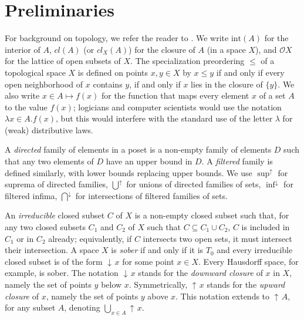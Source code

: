 \documentclass[preprint,12pt]{elsarticle}
\DeclareMathOperator{\upc}{\uparrow\!}
\DeclareMathOperator{\dc}{\downarrow\!}
\newcommand\Smyth{{\mathcal Q}}
\newcommand\Vt{\mathsf{V}}
\newcommand\SV{\Smyth_{\Vt}}
\newcommand\Val{{\mathbf V}}
\newcommand\Open{{\mathcal O}}
\newcommand\Topcat{\mathbf{Top}}
\newcommand{\interior}[1]{\text{int} ({#1})} %
\newcommand\dsup{\sup\nolimits^{\scriptstyle\uparrow}}
\newcommand\finf{\inf\nolimits^{\scriptstyle\downarrow}}
\newcommand\dcup{\bigcup\nolimits^{\scriptstyle\uparrow}}
\newcommand\fcap{\bigcap\nolimits^{\scriptstyle\downarrow}}
\begin{document}

\section{Preliminaries}
\label{sec:preliminaries}


For background on topology, we refer the reader to
\cite{JGL-topology}.  We write $\interior A$ for the interior of $A$,
$cl (A)$ (or $cl_X (A)$) for the closure of $A$ (in a space $X$), and
$\Open X$ for the lattice of open subsets of $X$.  The specialization
preordering $\leq$ of a topological space $X$ is defined on points
$x, y \in X$ by $x \leq y$ if and only if every open neighborhood of
$x$ contains $y$, if and only if $x$ lies in the closure of $\{y\}$.
We also write $x \in A \mapsto f (x)$ for the function that maps every
element $x$ of a set $A$ to the value $f (x)$; logicians and computer
scientists would use the notation $\lambda x \in A . f (x)$, but this
would interfere with the standard use of the letter $\lambda$ for
(weak) distributive laws.

A \emph{directed} family of elements in a poset is a non-empty family
of elements $D$ such that any two elements of $D$ have an upper bound
in $D$.  A \emph{filtered} family is defined similarly, with lower
bounds replacing upper bounds.  We use $\dsup$ for suprema of directed
families, $\dcup$ for unions of directed families of sets, $\finf$ for
filtered infima, $\fcap$ for intersections of filtered families of
sets.

An \emph{irreducible} closed subset $C$ of $X$ is a non-empty closed
subset such that, for any two closed subsets $C_1$ and $C_2$ of $X$
such that $C \subseteq C_1 \cup C_2$, $C$ is included in $C_1$ or in
$C_2$ already; equivalently, if $C$ intersects two open sets, it must
intersect their intersection.  A space $X$ is \emph{sober} if and only
if it is $T_0$ and every irreducible closed subset is of the form
$\dc x$ for some point $x \in X$.  Every Hausdorff space, for example,
is sober.  The notation $\dc x$ stands for the \emph{downward closure}
of $x$ in $X$, namely the set of points $y$ below $x$.  Symmetrically,
$\upc x$ stands for the \emph{upward closure} of $x$, namely the set
of points $y$ above $x$.  This notation extends to $\upc A$, for any
subset $A$, denoting $\bigcup_{x \in A} \upc x$.
\end{document}
